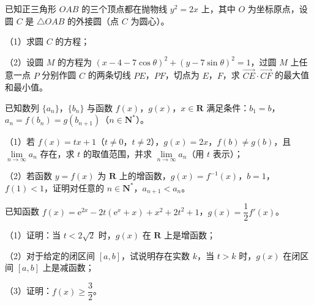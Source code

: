 \endgroup
\begin{question}
已知正三角形 $OAB$ 的三个顶点都在抛物线 $y^2=2x$ 上，其中 $O$ 为坐标原点，设圆 $C$ 是 $\triangle OAB$ 的外接圆（点 $C$ 为圆心）。

（1）求圆 $C$ 的方程；

（2）设圆 $M$ 的方程为 $(x-4-7\cos\theta)^2+(y-7\sin\theta)^2=1$，过圆 $M$ 上任意一点 $P$ 分别作圆 $C$ 的两条切线 $PE$，$PF$，切点为 $E$，$F$，求 $\overrightarrow{CE}\cdot\overrightarrow{CF}$ 的最大值和最小值。

\end{question}
\begin{question}
已知数列 $\{a_n\}$，$\{b_n\}$ 与函数 $f(x)$，$g(x)$，$x\in\mathbf R$ 满足条件：$b_1=b$，$a_n=f(b_n)=g(b_{n+1})$（$n\in\mathbf N^*$）。

（1）若 $f(x)=tx+1$（$t\neq0$，$t\neq2$），$g(x)=2x$，$f(b)\neq g(b)$，且 $\lim\limits_{n\to\infty}a_n$ 存在，求 $t$ 的取值范围，并求 $\lim\limits_{n\to\infty}a_n$（用 $t$ 表示）；

（2）若函数 $y=f(x)$ 为 $\mathbf R$ 上的增函数，$g(x)=f^{-1}(x)$，$b=1$，$f(1)<1$，证明对任意的 $n\in\mathbf N^*$，$a_{n+1}<a_n$。

\end{question}
\begin{question}
已知函数 $f(x)=\mathrm e^{2x}-2t(\mathrm e^x+x)+x^2+2t^2+1$，$g(x)=\dfrac12f'(x)$。

（1）证明：当 $t<2\sqrt2$ 时，$g(x)$ 在 $\mathbf R$ 上是增函数；

（2）对于给定的闭区间 $[a,b]$，试说明存在实数 $k$，当 $t>k$ 时，$g(x)$ 在闭区间 $[a,b]$ 上是减函数；

（3）证明：$f(x)\geqslant\dfrac32$。

\end{question}